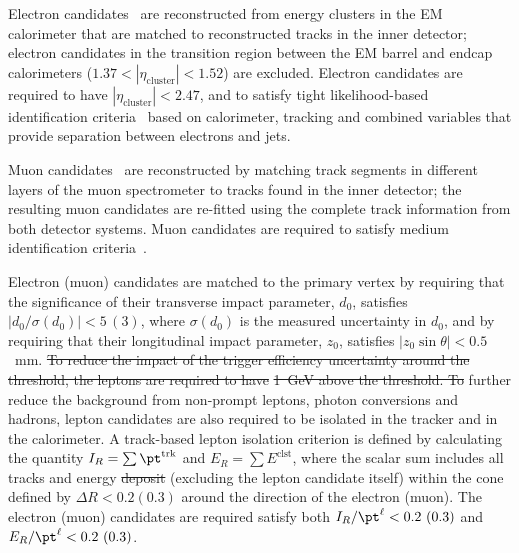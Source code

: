 \documentclass[PAPER, coverpage, atlasdraft=true, texlive=2016, UKenglish]{\ATLASLATEXPATH atlasdoc}
\providecommand{\DIFadd}[1]{{\protect\color{blue}\uwave{#1}}} %
\providecommand{\DIFdel}[1]{{\protect\color{red}\sout{#1}}}                      %
\providecommand{\DIFaddbegin}{} %
\providecommand{\DIFaddend}{} %
\providecommand{\DIFdelbegin}{} %
\providecommand{\DIFdelend}{} %
\begin{document}
Electron candidates~\cite{ATLAS-CONF-2016-024,Aaboud:2018ugz} are reconstructed from energy 
clusters in the EM calorimeter that are matched to reconstructed tracks in the inner detector;
electron candidates in the transition region between the EM barrel and endcap calorimeters 
($1.37 < |\eta_{\textrm{cluster}}| < 1.52$) are excluded.
Electron candidates are required to have $|\eta_{\textrm{cluster}}| < 2.47$, and to satisfy tight likelihood-based identification 
criteria~\cite{ATLAS-CONF-2016-024} based on calorimeter, tracking and combined variables that provide 
separation between electrons and jets. 

Muon candidates~\cite{Aad:2016jkr} are reconstructed by matching track segments in %
different layers of the muon spectrometer to tracks found in the inner detector;
the resulting muon candidates are re-fitted using the complete track information from both detector systems.
Muon candidates are required to satisfy medium identification criteria~\cite{Aad:2016jkr}. 

Electron (muon) candidates are matched to the primary vertex by requiring that the significance of their transverse impact parameter, $d_0$, 
satisfies $|d_0/\sigma(d_0)|<5\,(3)$, where $\sigma(d_0)$ is the measured uncertainty in $d_0$,
and by requiring that their longitudinal impact parameter, $z_0$, satisfies $|z_0 \sin\theta|<0.5$~mm.
\DIFdelbegin \DIFdel{To reduce the impact of the trigger efficiency uncertainty around the threshold, the leptons are required to have }%
\DIFdel{1~GeV above the threshold.
To }\DIFdelend %
\DIFaddbegin \DIFadd{To }\DIFaddend further reduce the background from non-prompt leptons, photon conversions and hadrons, lepton candidates are also required to be isolated 
in the tracker and in the calorimeter.
A track-based lepton isolation criterion is defined by calculating the quantity $I_R = \sum \pt^{\textrm{trk}}$ and $E_R = \sum E^{\textrm{clst}}$, where
the scalar sum includes all tracks and energy \DIFdelbegin \DIFdel{deposit }\DIFdelend \DIFaddbegin \DIFadd{deposits }\DIFaddend (excluding the lepton candidate itself) within the cone defined by $\Delta R<0.2 (0.3)$ around the %
direction of the electron (muon). The electron (muon) candidates are required \DIFaddbegin \DIFadd{to }\DIFaddend satisfy both $I_R/\pt^\ell < 0.2~(0.3)$ and $E_R/\pt^\ell < 0.2~(0.3)$.
\end{document}
